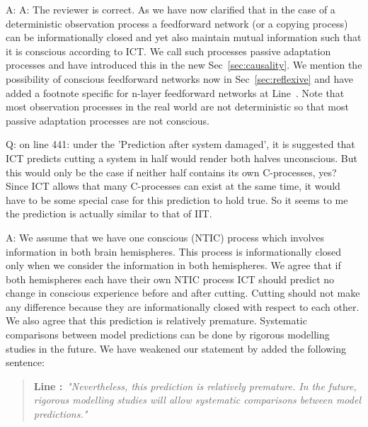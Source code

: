 \documentclass[utf8]{article}
\newcounter{cQuestion}[section]
\newenvironment{question}
    {\refstepcounter{cQuestion}\color{Blue}\noindent\newline Q\thecQuestion:}
    {~\newline}
\newenvironment{ans}  
    {\color{Black}\noindent A:}
    {~\newline}
\newcommand{\addnew}[2]{\blockcquote{}{\textbf{Line #1:}~\newline\textit{"#2"}}
}
\begin{document}
 		\begin{ans}
 			A: The reviewer is correct. As we have now clarified that in the case of a deterministic observation process a feedforward network (or a copying process) can be informationally closed and yet also maintain mutual information such that it is conscious according to ICT. We call such processes passive adaptation processes and have introduced this in the new Sec~\ref{sec:causality}. We mention the possibility of conscious feedforward networks now in Sec~\ref{sec:reflexive} and have added a footnote specific for n-layer feedforward networks at Line~. Note that most observation processes in the real world are not deterministic so that most passive adaptation processes are not conscious. 	
 		\end{ans}
 	
    
    	\begin{question}
    		on line 441: under the 'Prediction after system damaged', it is suggested that ICT predicts cutting a system in half would render both halves unconscious. But this would only be the case if neither half contains its own C-processes, yes? Since ICT allows that many C-processes can exist at the same time, it would have to be some special case for this prediction to hold true. So it seems to me the prediction is actually similar to that of IIT.
    	\end{question}
    
    
    	\begin{ans}
        	We assume that we have one conscious (NTIC) process which involves information in both brain hemispheres. This process is informationally closed only when we consider the information in both hemispheres. We agree that if both hemispheres each have their own NTIC process ICT should predict no change in conscious experience before and after cutting. Cutting should not make any difference because they are informationally closed with respect to each other. We also agree that this prediction is relatively premature. Systematic comparisons between model predictions can be done by rigorous modelling studies in the future. We have weakened our statement by added the following sentence:
        	
        	\addnew{}{Nevertheless, this prediction is relatively premature. In the future, rigorous modelling studies will allow systematic comparisons between model predictions.}
        	
    	\end{ans}
    
\end{document}
